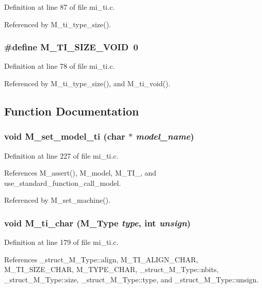 Definition at line 87 of file mi\_\-ti.c.

Referenced by M\_\-ti\_\-type\_\-size().
\subsubsection{\setlength{\rightskip}{0pt plus 5cm}\#define M\_\-TI\_\-SIZE\_\-VOID~0}\label{mi__ti_8c_549aa4cf03954346b365fdcedd42bb2c}




Definition at line 78 of file mi\_\-ti.c.

Referenced by M\_\-ti\_\-type\_\-size(), and M\_\-ti\_\-void().

\subsection{Function Documentation}
\subsubsection{\setlength{\rightskip}{0pt plus 5cm}void M\_\-set\_\-model\_\-ti (char $\ast$ {\em model\_\-name})}\label{mi__ti_8c_9454cdab1f936078b7fa2353895079b1}




Definition at line 227 of file mi\_\-ti.c.

References M\_\-assert(), M\_\-model, M\_\-TI\_, and use\_\-standard\_\-function\_\-call\_\-model.

Referenced by M\_\-set\_\-machine().
\subsubsection{\setlength{\rightskip}{0pt plus 5cm}void M\_\-ti\_\-char (\bf{M\_\-Type} {\em type}, int {\em unsign})}\label{mi__ti_8c_95bff157bb3546a603e371e15e3f9daa}




Definition at line 179 of file mi\_\-ti.c.

References \_\-struct\_\-M\_\-Type::align, M\_\-TI\_\-ALIGN\_\-CHAR, M\_\-TI\_\-SIZE\_\-CHAR, M\_\-TYPE\_\-CHAR, \_\-struct\_\-M\_\-Type::nbits, \_\-struct\_\-M\_\-Type::size, \_\-struct\_\-M\_\-Type::type, and \_\-struct\_\-M\_\-Type::unsign.

